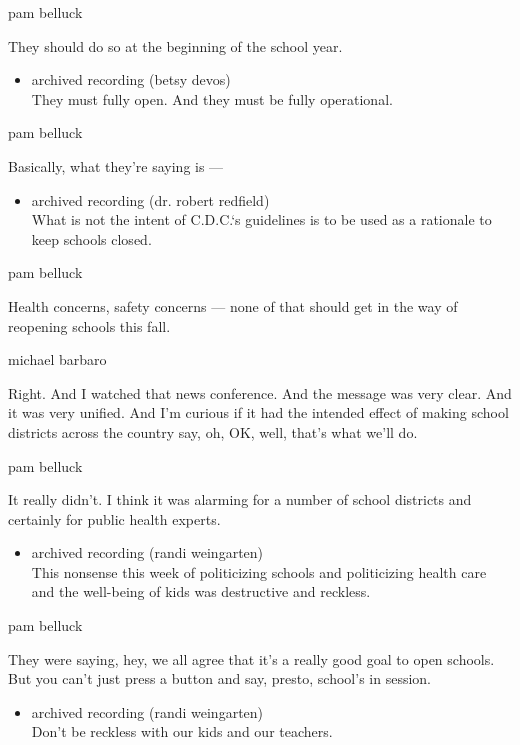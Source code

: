 pam belluck

They should do so at the beginning of the school year.

\begin{itemize}
\tightlist
\item
  archived recording (betsy devos)\\
  They must fully open. And they must be fully operational.
\end{itemize}

pam belluck

Basically, what they're saying is ---

\begin{itemize}
\tightlist
\item
  archived recording (dr. robert redfield)\\
  What is not the intent of C.D.C.`s guidelines is to be used as a
  rationale to keep schools closed.
\end{itemize}

pam belluck

Health concerns, safety concerns --- none of that should get in the way
of reopening schools this fall.

michael barbaro

Right. And I watched that news conference. And the message was very
clear. And it was very unified. And I'm curious if it had the intended
effect of making school districts across the country say, oh, OK, well,
that's what we'll do.

pam belluck

It really didn't. I think it was alarming for a number of school
districts and certainly for public health experts.

\begin{itemize}
\tightlist
\item
  archived recording (randi weingarten)\\
  This nonsense this week of politicizing schools and politicizing
  health care and the well-being of kids was destructive and reckless.
\end{itemize}

pam belluck

They were saying, hey, we all agree that it's a really good goal to open
schools. But you can't just press a button and say, presto, school's in
session.

\begin{itemize}
\tightlist
\item
  archived recording (randi weingarten)\\
  Don't be reckless with our kids and our teachers.
\end{itemize}

